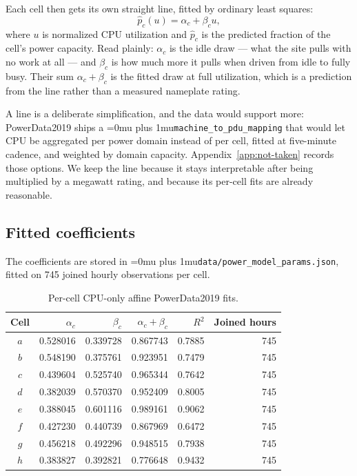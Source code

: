 ﻿\documentclass[12pt]{article}
\newcommand{\codepath}[1]{{\Urlmuskip=0mu plus 1mu\relax\nolinkurl{#1}}}
\begin{document}
Each cell then gets its own straight line, fitted by ordinary least squares:
\begin{equation}
  \widehat{p}_{c}(u)
  =
  \alpha_c + \beta_c u,
  \label{eq:powerdata-affine-fit}
\end{equation}
where \(u\) is normalized CPU utilization and \(\widehat{p}_c\) is the predicted
fraction of the cell's power capacity. Read plainly: \(\alpha_c\) is the idle
draw --- what the site pulls with no work at all --- and \(\beta_c\) is how much
more it pulls when driven from idle to fully busy. Their sum \(\alpha_c+\beta_c\)
is the fitted draw at full utilization, which is a prediction from the line
rather than a measured nameplate rating.

A line is a deliberate simplification, and the data would support more:
PowerData2019 ships a \codepath{machine_to_pdu_mapping} that would let CPU be
aggregated per power domain instead of per cell, fitted at five-minute cadence,
and weighted by domain capacity. Appendix~\ref{app:not-taken} records those
options. We keep the line because it stays interpretable after being multiplied
by a megawatt rating, and because its per-cell fits are already reasonable.

\subsection{Fitted coefficients}
\label{subsec:powerdata-coefficients}

The coefficients are stored in \codepath{data/power_model_params.json}, fitted
on 745 joined hourly observations per cell.

\begin{table}[htbp]
  \centering
  \small
  \caption{Per-cell CPU-only affine PowerData2019 fits.}
  \label{tab:powerdata-coefficients}
  \begin{tabular}{@{}crrrrr@{}}
    \toprule
    Cell & \(\alpha_c\) & \(\beta_c\) & \(\alpha_c+\beta_c\)
         & \(R^2\) & Joined hours \\
    \midrule
    \(a\) & 0.528016 & 0.339728 & 0.867743 & 0.7885 & 745 \\
    \(b\) & 0.548190 & 0.375761 & 0.923951 & 0.7479 & 745 \\
    \(c\) & 0.439604 & 0.525740 & 0.965344 & 0.7642 & 745 \\
    \(d\) & 0.382039 & 0.570370 & 0.952409 & 0.8005 & 745 \\
    \(e\) & 0.388045 & 0.601116 & 0.989161 & 0.9062 & 745 \\
    \(f\) & 0.427230 & 0.440739 & 0.867969 & 0.6472 & 745 \\
    \(g\) & 0.456218 & 0.492296 & 0.948515 & 0.7938 & 745 \\
    \(h\) & 0.383827 & 0.392821 & 0.776648 & 0.9432 & 745 \\
    \bottomrule
  \end{tabular}
\end{table}
\end{document}
